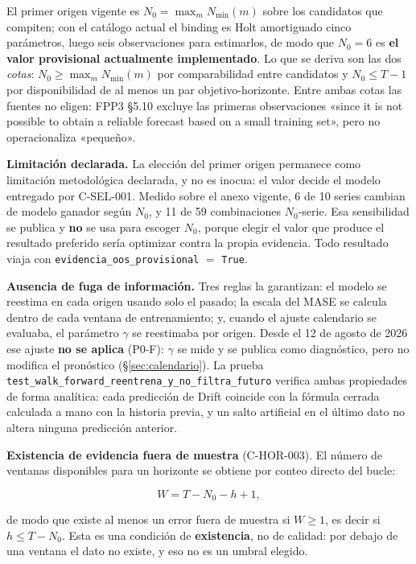 \documentclass[12pt]{article}
\begin{document}
El primer origen vigente es $N_0 = \max_m N_{\min}(m)$ sobre los candidatos que compiten; con el cat\'alogo actual el binding es Holt amortiguado \textemdash{}cinco par\'ametros, luego seis observaciones para estimarlos\textemdash{}, de modo que $N_0 = 6$ es \textbf{el valor provisional actualmente implementado}. Lo que se deriva son las dos \emph{cotas}: $N_0 \geq \max_m N_{\min}(m)$ por comparabilidad entre candidatos y $N_0 \leq T-1$ por disponibilidad de al menos un par objetivo-horizonte. Entre ambas cotas las fuentes no eligen: FPP3 \S5.10 excluye las primeras observaciones «since it is not possible to obtain a reliable forecast based on a small training set», pero no operacionaliza «peque\~no».

\textbf{Limitaci\'on declarada.} La elecci\'on del primer origen permanece como limitaci\'on metodol\'ogica declarada, y no es inocua: el valor decide el modelo entregado por C-SEL-001. Medido sobre el anexo vigente, 6 de 10 series cambian de modelo ganador seg\'un $N_0$, y 11 de 59 combinaciones $N_0$-serie. Esa sensibilidad se publica y \textbf{no} se usa para escoger $N_0$, porque elegir el valor que produce el resultado preferido ser\'ia optimizar contra la propia evidencia. Todo resultado viaja con \texttt{evidencia\_oos\_provisional} $=$ \texttt{True}.

\textbf{Ausencia de fuga de informaci\'on.} Tres reglas la garantizan: el modelo se reestima en cada origen usando solo el pasado; la escala del MASE se calcula dentro de cada ventana de entrenamiento; y, cuando el ajuste calendario se evaluaba, el par\'ametro $\gamma$ se reestimaba por origen. Desde el 12 de agosto de 2026 ese ajuste \textbf{no se aplica} (P0-F): $\gamma$ se mide y se publica como diagn\'ostico, pero no modifica el pron\'ostico (\S\ref{sec:calendario}). La prueba \texttt{test\_walk\_forward\_reentrena\_y\_no\_filtra\_futuro} verifica ambas propiedades de forma anal\'itica: cada predicci\'on de Drift coincide con la f\'ormula cerrada calculada a mano con la historia previa, y un salto artificial en el \'ultimo dato no altera ninguna predicci\'on anterior.

\textbf{Existencia de evidencia fuera de muestra} (C-HOR-003). El n\'umero de ventanas disponibles para un horizonte se obtiene por conteo directo del bucle:

\begin{equation}
W = T - N_0 - h + 1,
\label{eq:ventanas_oos}
\end{equation}

de modo que existe al menos un error fuera de muestra si $W \geq 1$, es decir si $h \leq T - N_0$. Esta es una condici\'on de \textbf{existencia}, no de calidad: por debajo de una ventana el dato no existe, y eso no es un umbral elegido.
\end{document}
